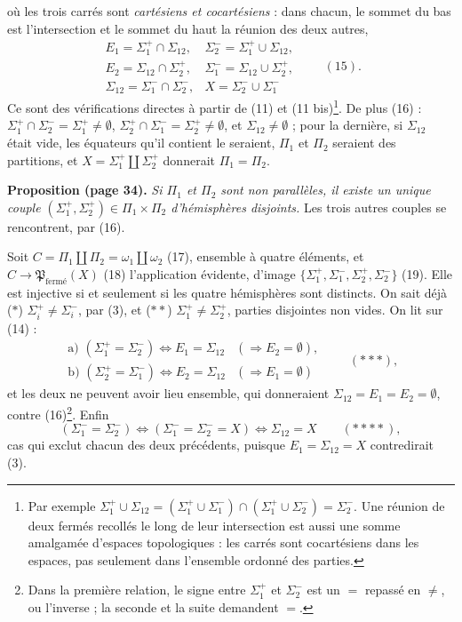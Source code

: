 \documentclass[11pt,a4paper]{article}
\begin{document}
où les trois carrés sont \emph{cartésiens et cocartésiens} : dans chacun, le
sommet du bas est l'intersection et le sommet du haut la réunion des deux
autres,
\[
\begin{array}{ll}
E_1 = \Sigma_1^{+} \cap \Sigma_{12}, & \Sigma_2^{-} = \Sigma_1^{+} \cup \Sigma_{12}, \\
E_2 = \Sigma_{12} \cap \Sigma_2^{+}, & \Sigma_1^{-} = \Sigma_{12} \cup \Sigma_2^{+}, \\
\Sigma_{12} = \Sigma_1^{-} \cap \Sigma_2^{-}, & X = \Sigma_2^{-} \cup \Sigma_1^{-}
\end{array}
\qquad (15).
\]
Ce sont des vérifications directes à partir de (11) et (11 bis)\footnote{Par
exemple $\Sigma_1^{+} \cup \Sigma_{12} = (\Sigma_1^{+} \cup \Sigma_1^{-})
\cap (\Sigma_1^{+} \cup \Sigma_2^{-}) = \Sigma_2^{-}$. Une réunion de deux
fermés recollés le long de leur intersection est aussi une somme amalgamée
d'espaces topologiques : les carrés sont cocartésiens dans les espaces, pas
seulement dans l'ensemble ordonné des parties.}. De plus (16) :
$\Sigma_1^{+} \cap \Sigma_2^{-} = \Sigma_1^{+} \neq \emptyset$,
$\Sigma_2^{+} \cap \Sigma_1^{-} = \Sigma_2^{+} \neq \emptyset$, et
$\Sigma_{12} \neq \emptyset$ ; pour la dernière, si $\Sigma_{12}$ était vide,
les équateurs qu'il contient le seraient, $\Pi_1$ et $\Pi_2$ seraient des
partitions, et $X = \Sigma_1^{+} \amalg \Sigma_2^{+}$ donnerait $\Pi_1 = \Pi_2$.

\textbf{Proposition (page 34).} \emph{Si $\Pi_1$ et $\Pi_2$ sont non
parallèles, il existe un unique couple $(\Sigma_1^{+}, \Sigma_2^{+}) \in
\Pi_1 \times \Pi_2$ d'hémisphères disjoints.} Les trois autres couples se
rencontrent, par (16).

Soit $C = \Pi_1 \amalg \Pi_2 = \omega_1 \amalg \omega_2$ (17), ensemble à
quatre éléments, et $C \to \mathfrak{P}_{\text{fermé}}(X)$ (18) l'application
évidente, d'image $\{\Sigma_1^{+}, \Sigma_1^{-}, \Sigma_2^{+}, \Sigma_2^{-}\}$
(19). Elle est injective si et seulement si les quatre hémisphères sont
distincts. On sait déjà ($*$) $\Sigma_i^{+} \neq \Sigma_i^{-}$, par (3), et
($**$) $\Sigma_1^{+} \neq \Sigma_2^{+}$, parties disjointes non vides. On lit
sur (14) :
\[
\begin{array}{ll}
\text{a) } (\Sigma_1^{+} = \Sigma_2^{-}) \Longleftrightarrow E_1 = \Sigma_{12} & (\Rightarrow E_2 = \emptyset), \\
\text{b) } (\Sigma_2^{+} = \Sigma_1^{-}) \Longleftrightarrow E_2 = \Sigma_{12} & (\Rightarrow E_1 = \emptyset)
\end{array}
\qquad (*{*}*),
\]
et les deux ne peuvent avoir lieu ensemble, qui donneraient $\Sigma_{12} =
E_1 = E_2 = \emptyset$, contre (16)\footnote{Dans la première relation, le
signe entre $\Sigma_1^{+}$ et $\Sigma_2^{-}$ est un $=$ repassé en $\neq$, ou
l'inverse ; la seconde et la suite demandent $=$.}. Enfin
\[
(\Sigma_1^{-} = \Sigma_2^{-}) \Longleftrightarrow (\Sigma_1^{-} =
\Sigma_2^{-} = X) \Longleftrightarrow \Sigma_{12} = X \qquad (*{*}{*}*),
\]
cas qui exclut chacun des deux précédents, puisque $E_1 = \Sigma_{12} = X$
contredirait (3).
\end{document}
